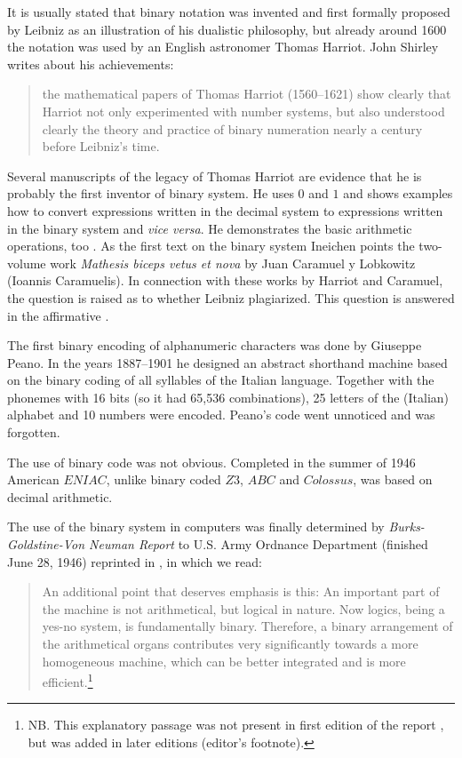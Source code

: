 \documentclass[pdftex,12pt]{article}
\begin{document}
It is usually stated that binary notation was invented and first formally proposed by Leibniz as an illustration of his dualistic philosophy, but already around 1600 the notation was used by  an English astronomer Thomas Harriot. John Shirley \parencite*{Shirley1951} writes about his achievements:  \begin{quote} \small the mathematical papers of Thomas Harriot (1560--1621) show clearly that Harriot not only experimented with number systems, but also understood clearly the theory and practice of binary numeration nearly a century before Leibniz's time.  \end{quote} 
Several manuscripts of the legacy of Thomas Harriot are evidence that he is probably the first inventor of binary system. He uses $0$ and $1$ and shows examples how to convert expressions  written in the decimal system to expressions written in the binary system and \emph{vice versa}. He demonstrates the basic arithmetic operations, too \parencite{Ineichen2008}. As the first text on the binary system Ineichen  points the two-volume work \emph{Mathesis biceps vetus et nova} \parencite*{Lobkowitz1670} by Juan Caramuel y Lobkowitz (Ioannis Caramuelis). In connection with these works by Harriot and Caramuel, the question is raised as to whether Leibniz plagiarized. This question is answered in the affirmative \parencite{Ares2018}.


The first binary encoding of alphanumeric characters was done by Giuseppe Peano. In the years 1887--1901 he designed an abstract shorthand machine based on the binary coding of all syllables of the Italian language. Together with the phonemes with 16 bits (so it had 65,536 combinations), 25 letters of the (Italian) alphabet and 10 numbers were encoded. Peano's code went unnoticed and was forgotten.

The use of binary code was not obvious. Completed in the summer of 1946 American $ENIAC$, unlike binary coded $Z3$, $ABC$ and $Colossus$, was based on decimal arithmetic.

The use of the binary system in computers was finally determined by \emph{Burks-Goldstine-Von Neuman Report} to U.S. Army Ordnance Department (finished June 28, 1946) reprinted in \parencite*[p.105]{BurksGoldstineNeumann1947}, in which we read: \begin{quote} \small An additional point that deserves emphasis is this: An important part of the machine is not arithmetical, but logical in nature. Now logics, being a yes-no system, is fundamentally binary. Therefore, a binary arrangement of the arithmetical organs contributes very significantly towards a more homogeneous machine, which can be better integrated and is more efficient.\footnote{NB. This explanatory passage was not present in first edition of the report \parencite[cf.][p.13]{burks_preliminary_1946}, but was added in later editions (editor's footnote).}
\end{quote}
\end{document}
